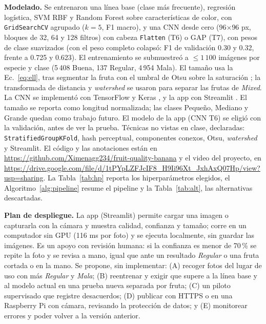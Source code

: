 \documentclass[conference]{IEEEtran}
\begin{document}
\textbf{Modelado.} Se entrenaron una l\'inea base (clase m\'as frecuente), regresi\'on log\'istica, SVM RBF y Random Forest sobre caracter\'isticas de color, con \texttt{GridSearchCV} agrupado ($k=5$, F1 macro), y una CNN desde cero (96$\times$96 px, bloques de 32, 64 y 128 filtros) con cabeza \texttt{Flatten} (T6) o GAP (T7), con pesos de clase suavizados (con el peso completo colaps\'o: F1 de validaci\'on 0.30 y 0.32, frente a 0.725 y 0.623). El entrenamiento se submuestre\'o a $\le 1\,100$ im\'agenes por especie y clase (5\,408 Buena, 137 Regular, 4\,954 Mala). El tama\~no usa la Ec.~\eqref{eq:ell}, tras segmentar la fruta con el umbral de Otsu sobre la saturaci\'on \cite{otsu1979}; la transformada de distancia y \emph{watershed} \cite{vincent1991watershed} se usaron para separar las frutas de \emph{Mixed}. La CNN se implement\'o con TensorFlow \cite{abadi2016tensorflow} y Keras \cite{chollet2015keras}, y la app con Streamlit \cite{streamlit}. El tama\~no se reporta como longitud normalizada; las clases Peque\~no, Mediano y Grande quedan como trabajo futuro. El modelo de la app (CNN T6) se eligi\'o con la validaci\'on, antes de ver la prueba. T\'ecnicas no vistas en clase, declaradas: \texttt{StratifiedGroupKFold}, hash perceptual, componentes conexos, Otsu, \emph{watershed} y Streamlit. El c\'odigo y las anotaciones est\'an en \url{https://github.com/Ximenagg234/fruit-quality-banana} y el video del proyecto, en \url{https://drive.google.com/file/d/1tPYpLZFJcIF8_H9Ii96Xt_JxhAxQ07Hp/view?usp=sharing}. La Tabla~\ref{tab:hp} reporta los hiperparámetros elegidos, el Algoritmo~\ref{alg:pipeline} resume el pipeline y la Tabla~\ref{tab:alt}, las alternativas descartadas.

\textbf{Plan de despliegue.} La app (Streamlit) permite cargar una imagen o capturarla con la c\'amara y muestra calidad, confianza y tama\~no; corre en un computador sin GPU (116 ms por foto) y se ejecuta localmente, sin guardar las im\'agenes. Es un apoyo con revisi\'on humana: si la confianza es menor de 70\,\% se repite la foto y se revisa a mano, igual que ante un resultado \emph{Regular} o una fruta cortada o en la mano. Se propone, sin implementar: (A) recoger fotos del lugar de uso con m\'as \emph{Regular} y \emph{Mala}; (B) reentrenar y exigir que supere a la l\'inea base y al modelo actual en una prueba nueva separada por fruta; (C) un piloto supervisado que registre desacuerdos; (D) publicar con HTTPS o en una Raspberry Pi con c\'amara, revisando la protecci\'on de datos; y (E) monitorear errores y poder volver a la versi\'on anterior.
\end{document}
